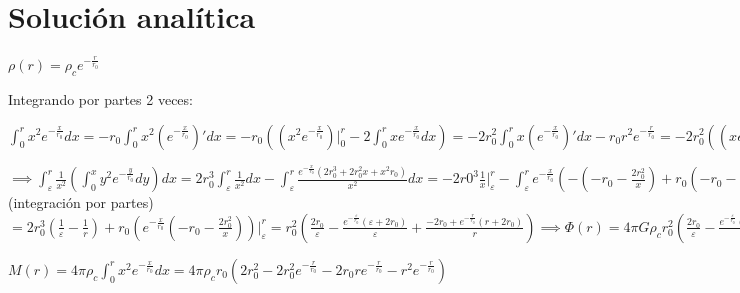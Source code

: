 \documentclass[12pt]{book}
\begin{document}
\clearpage

\section*{Solución analítica}
\begin{description}

\item  $\rho(r) =  \rho_c  e^{-\frac{r}{r_0}} $  
\item Integrando por partes 2 veces:
\item $\int_0^r{x^2 e^{-\frac{x}{r_0}}dx} = - r_0 \int_0^r{x^2 (e^{-\frac{x}{r_0}})\prime dx}
=-r_0( (x^2 e^{-\frac{x}{r_0}})\Big|_0^r  - 2\int_0^r{x e^{-\frac{x}{r_0}}dx})  = 
-2 r_0^2 \int_0^r{x (e^{-\frac{x}{r_0}})\prime dx} - r_0 r^2 e^{-\frac{r}{r_0}} = -2 r_0^2 ((x e^{-\frac{x}{r_0}})\Big|_0^r - \int_0^r{e^{-\frac{x}{r_0}}dx}) - r_0 r^2 e^{-\frac{r}{r_0}} = 
-2 r_0^3 e^{-\frac{x}{r_0}}\Big|_0^r -2 r_0^2 r e^{-\frac{r}{r_0}} - r_0 r^2 e^{-\frac{r}{r_0}} = 
2 r_0^3 -2 r_0^3 e^{-\frac{r}{r_0}} -2 r_0^2 r e^{-\frac{r}{r_0}} - r_0 r^2 e^{-\frac{r}{r_0}}  
= 2  r_0^3 -  r_0 e^{-\frac{r}{r_0}} (2 r_0^2  + 2 r_0 r + r^2)
$

\item $\implies \int_\varepsilon^r{ \frac{1}{x^2}(\int_0^x{y^2 e^{-\frac{y}{r_0}}dy})dx} = 
2 r_0^3 \int_\varepsilon^r{\frac{1}{x^2}dx} - \int_\varepsilon^r{\frac{ e^{-\frac{x}{r_0}} (2 r_0^3 + 2 r_0^2 x +x^2 r_0)}{x^2}dx }=
-2 r0^3 \frac{1}{x}\Big|_\varepsilon^r -  \int_\varepsilon^r{e^{-\frac{x}{r_0}} (- (-r_0 - \frac{2 r_0^2}{x}) + r_0 (-r_0 - \frac{2 r_0^2}{x})\prime) dx } = 
2 r_0^3 (\frac{1}{\varepsilon} - \frac{1}{r}) + r_0 ((e^{-\frac{x}{r_0}})\prime (-r_0 - \frac{2 r_0^2}{x})  + e^{-\frac{x}{r_0}} (-r_0 - \frac{2 r_0^2}{x})\prime )= $(integración por partes)$
=2 r_0^3 (\frac{1}{\varepsilon} - \frac{1}{r}) + r_0 (e^{-\frac{x}{r_0}} (-r_0 - \frac{2 r_0^2}{x})) \Big|_\varepsilon^r =
 r_0^2 (\frac{2 r_0}{\varepsilon} - \frac{e^{-\frac{\varepsilon}{r_0}}(\varepsilon + 2 r_0)  }{\varepsilon} + \frac{-2 r_0 + e^{-\frac{r}{r_0}} (r + 2 r_0) }{r} )
\implies \Phi(r) = 4 \pi G \rho_c r_0^2 (\frac{2 r_0}{\varepsilon} - \frac{e^{-\frac{\varepsilon}{r_0}}(\varepsilon + 2 r_0)  }{\varepsilon}
+ \frac{-2 r_0 + e^{-\frac{r}{r_0}} (r + 2 r_0) }{r} )$

\item $M(r) = 4 \pi \rho_c \int_0^r{x^2 e^{-\frac{x}{r_0}}dx} = 4 \pi \rho_c r_0 ( 2 r_0^2 - 2 r_0^2 e^{-\frac{r}{r_0}} - 2 r_0 r e^{-\frac{r}{r_0}} - r^2 e^{-\frac{r}{r_0}}) $


\end{description}
\end{document}
